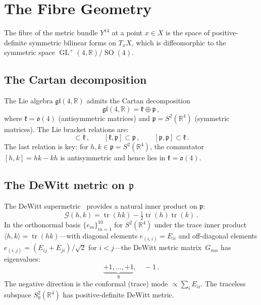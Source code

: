 \documentclass[12pt,a4paper]{article}
\theoremstyle{definition}
\newcommand{\tr}{\operatorname{tr}}
\newcommand{\GL}{\operatorname{GL}}
\newcommand{\SO}{\operatorname{SO}}
\newcommand{\R}{\mathbb{R}}
\begin{document}
\section{The Fibre Geometry}
\label{sec:fibre}

The fibre of the metric bundle $Y^{14}$ at a point $x \in X$ is the space of positive-definite symmetric bilinear forms on $T_xX$, which is diffeomorphic to the symmetric space $\GL^+(4,\R)/\SO(4)$.

\subsection{The Cartan decomposition}

The Lie algebra $\mathfrak{gl}(4,\R)$ admits the Cartan decomposition
\begin{equation}
\mathfrak{gl}(4,\R) = \mathfrak{k} \oplus \mathfrak{p}\,,
\end{equation}
where $\mathfrak{k} = \mathfrak{o}(4)$ (antisymmetric matrices) and $\mathfrak{p} = S^2(\R^4)$ (symmetric matrices).
The Lie bracket relations are:
\begin{equation}
[\mathfrak{k}, \mathfrak{k}] \subset \mathfrak{k}\,,\qquad
[\mathfrak{k}, \mathfrak{p}] \subset \mathfrak{p}\,,\qquad
[\mathfrak{p}, \mathfrak{p}] \subset \mathfrak{k}\,.
\end{equation}
The last relation is key: for $h, k \in \mathfrak{p} = S^2(\R^4)$, the commutator $[h,k] = hk - kh$ is antisymmetric and hence lies in $\mathfrak{k} = \mathfrak{o}(4)$.

\subsection{The DeWitt metric on $\mathfrak{p}$}

The DeWitt supermetric~\cite{DeWitt1967} provides a natural inner product on $\mathfrak{p}$:
\begin{equation}
\label{eq:dewitt}
\mathcal{G}(h,k) = \tr(hk) - \tfrac{1}{2}\tr(h)\tr(k)\,.
\end{equation}
In the orthonormal basis $\{e_m\}_{m=1}^{10}$ for $S^2(\R^4)$ under the trace inner product $\langle h, k \rangle = \tr(hk)$---with diagonal elements $e_{(i,i)} = E_{ii}$ and off-diagonal elements $e_{(i,j)} = (E_{ij} + E_{ji})/\sqrt{2}$ for $i < j$---the DeWitt metric matrix~$G_{mn}$ has eigenvalues:
\begin{equation}
\underbrace{+1, \ldots, +1}_{9}, \quad -1\,.
\end{equation}
The negative direction is the conformal (trace) mode $\propto \sum_i E_{ii}$.
The traceless subspace $S^2_0(\R^4)$ has positive-definite DeWitt metric.
\end{document}
